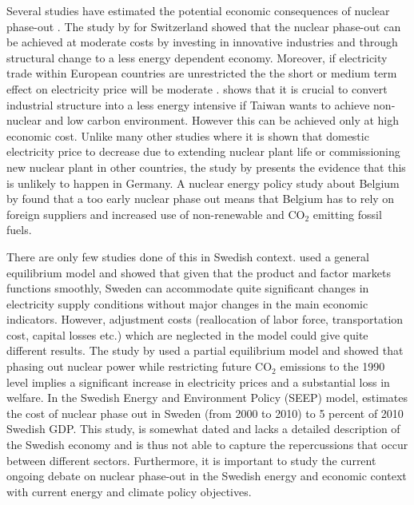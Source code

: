Several studies have estimated the potential economic consequences of nuclear phase-out \citep{Bohringer2002, Nestle2012, Bretschger2012, Duscha0, Glomsrod2013, Kunsch2014}. The study by \cite{Bretschger2012} for Switzerland showed that the nuclear phase-out can be achieved at moderate costs by investing in innovative industries and through structural change to a less energy dependent economy. Moreover, if electricity trade within European countries are unrestricted the the short or medium term effect on electricity price will be moderate \citep{Glomsrod2013}. \cite{Chen2013} shows that it is crucial to convert industrial structure into a less energy intensive if Taiwan wants to achieve non-nuclear and low carbon environment. However this can be achieved only at high economic cost. Unlike many other studies where it is shown that domestic electricity price to decrease due to extending nuclear plant life or commissioning new nuclear plant in other countries, the study by \citep{Nestle2012} presents the evidence that this is unlikely to happen in Germany. A nuclear energy policy study about Belgium by \cite{Kunsch2014} found that a too early nuclear phase out means that Belgium has to rely on foreign suppliers and increased use of non-renewable and CO$_2$ emitting fossil fuels.

There are only few studies done of this in Swedish context. \cite{Bergman1981} used a general equilibrium model and showed that given that the product and factor markets functions smoothly, Sweden can accommodate quite significant changes in electricity supply conditions without major changes in the main economic indicators. However, adjustment costs (reallocation of labor force, transportation cost, capital losses etc.) which are neglected in the model could give quite different results. The study by \cite{Andersson1997} used a partial equilibrium model and showed that phasing out nuclear power while restricting future CO$_2$ emissions to the 1990 level implies a significant increase in electricity prices and a substantial loss in welfare. In the Swedish Energy and Environment Policy (SEEP) model, \cite{nordhaus1997swedish} estimates the cost of nuclear phase out in Sweden (from 2000 to 2010) to 5 percent of 2010 Swedish GDP. This study, is somewhat dated and lacks a detailed description of the Swedish economy and is thus not able to capture the repercussions that occur between different sectors. Furthermore, it is important to study the current ongoing debate on nuclear phase-out in the Swedish energy and economic context with current energy and climate policy objectives.

